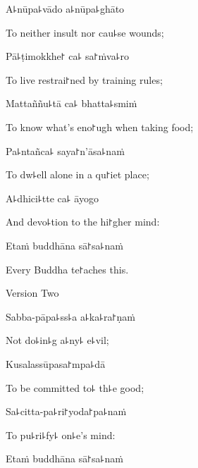 A꜕nūpa꜕vādo a꜕nūpa꜕ghāto

\begin{english}
  To neither insult nor cau꜕se wounds;
\end{english}

Pā꜕ṭimokkhe꜓ ca꜕ sa꜓ṁva꜕ro

\begin{english}
  To live restrai꜓ned by training rules;
\end{english}

Mattaññu꜕tā ca꜕ bhatta꜕smiṁ

\begin{english}
  To know what's eno꜓ugh when taking food;
\end{english}

Pa꜕ntañca꜕ saya꜓n'āsa꜕naṁ

\begin{english}
  To dw꜕ell alone in a qu꜓iet place;
\end{english}

A꜕dhici꜕tte ca꜕ āyogo

\begin{english}
  And devo꜕tion to the hi꜓gher mind:
\end{english}

Etaṁ buddhāna sā꜓sa꜕naṁ

\begin{english}
  Every Buddha te꜓aches this.
\end{english}

\clearpage

\begin{instruction}
  Version Two
\end{instruction}


Sabba-pāpa꜕ss꜕a a꜕ka꜕ra꜓ṇaṁ

\begin{english}
  Not do꜕in꜕g a꜕ny꜕ e꜕vil;
\end{english}

Kusalassūpasa꜓mpa꜕dā

\begin{english}
  To be committed to꜕ th꜕e good;
\end{english}

Sa꜕citta-pa꜕ri꜓yoda꜓pa꜕naṁ

\begin{english}
  To pu꜕ri꜕fy꜕ on꜕e's mind:
\end{english}

Etaṁ buddhāna sā꜓sa꜕naṁ

